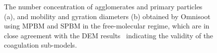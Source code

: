 \begin{figure}[H]
	\caption{The number concentration of agglomerates and primary particles (a), and mobility and gyration diameters (b) obtained by Omnisoot using MPBM and SPBM in the free-molecular regime, which are in close agreement with the DEM results~\citep{kholghy2021surface} indicating the validity of the coagulation sub-models.}
	\label{fig:coagvalid_Nd} 
\end{figure}


\begin{figure}[H]
	\centering
	\begin{subfigure}[t]{0.4\textwidth}
	\end{subfigure}
	\begin{subfigure}[t]{0.4\textwidth}
\end{subfigure}
\end{figure}
